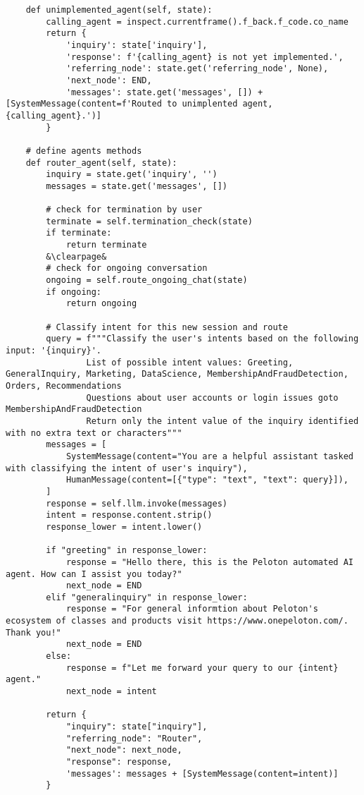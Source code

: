 \documentclass[11pt,letterpaper]{article}
\begin{document}
\begin{lstlisting}
    def unimplemented_agent(self, state):
        calling_agent = inspect.currentframe().f_back.f_code.co_name
        return {
            'inquiry': state['inquiry'],
            'response': f'{calling_agent} is not yet implemented.',
            'referring_node': state.get('referring_node', None),
            'next_node': END,
            'messages': state.get('messages', []) + [SystemMessage(content=f'Routed to unimplented agent, {calling_agent}.')]
        }

    # define agents methods
    def router_agent(self, state):
        inquiry = state.get('inquiry', '')
        messages = state.get('messages', [])

        # check for termination by user
        terminate = self.termination_check(state)
        if terminate:
            return terminate
        &\clearpage&
        # check for ongoing conversation
        ongoing = self.route_ongoing_chat(state)
        if ongoing:
            return ongoing
    
        # Classify intent for this new session and route
        query = f"""Classify the user's intents based on the following input: '{inquiry}'. 
                List of possible intent values: Greeting, GeneralInquiry, Marketing, DataScience, MembershipAndFraudDetection, Orders, Recommendations
                Questions about user accounts or login issues goto MembershipAndFraudDetection
                Return only the intent value of the inquiry identified with no extra text or characters"""
        messages = [
            SystemMessage(content="You are a helpful assistant tasked with classifying the intent of user's inquiry"),
            HumanMessage(content=[{"type": "text", "text": query}]),
        ]
        response = self.llm.invoke(messages)
        intent = response.content.strip()
        response_lower = intent.lower()
        
        if "greeting" in response_lower:
            response = "Hello there, this is the Peloton automated AI agent. How can I assist you today?"
            next_node = END
        elif "generalinquiry" in response_lower:
            response = "For general informtion about Peloton's ecosystem of classes and products visit https://www.onepeloton.com/. Thank you!"
            next_node = END
        else:
            response = f"Let me forward your query to our {intent} agent."
            next_node = intent

        return {
            "inquiry": state["inquiry"],
            "referring_node": "Router",
            "next_node": next_node,
            "response": response,
            'messages': messages + [SystemMessage(content=intent)]
        }       


\end{lstlisting}
\end{document}
